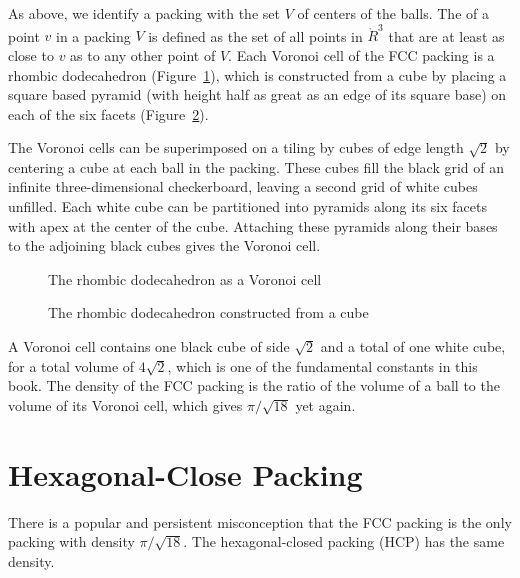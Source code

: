As above, we identify a packing with the set $V$ of centers of the balls.
The  of a point $v$ in a packing $V$ is defined as the set of all
points in $\ring{R}^3$ 
that are at least as close to $v$ as to any other point
of $V$.  Each Voronoi cell of the FCC packing is a
rhombic dodecahedron (Figure~\ref{fig:rhombic}),  %
which is constructed from a cube by placing a
square based pyramid (with height half as great as an edge of its
square base) on each of the six facets
(Figure~\ref{fig:rhombic-cube}).  %

The Voronoi cells can be superimposed on a tiling by cubes of edge length $\sqrt2$ by
centering a cube at each ball in the packing. These
cubes fill the black grid of an infinite three-dimensional
checkerboard, leaving a second grid of white cubes unfilled.  Each
white cube can be partitioned into pyramids along its six facets with apex
at the center of the cube.  Attaching these pyramids along their bases
to the adjoining black cubes gives the Voronoi cell.

\begin{figure}[htb]
  \centering
  \caption{The rhombic dodecahedron as a Voronoi cell}
  \label{fig:rhombic}
\end{figure}

\begin{figure}[htb]
  \centering
  \caption{The rhombic dodecahedron constructed from a cube}
  \label{fig:rhombic-cube}
\end{figure}

A Voronoi cell contains one black cube of side $\sqrt2$ and a total
of one white cube, for a total volume of $4\sqrt2$, which is
one of the fundamental constants in this book.  The density of the
FCC packing is the ratio of the volume of a ball to the volume
of its Voronoi cell, which gives $\pi/\sqrt{18}$ yet again.





\section{Hexagonal-Close Packing}

There is a popular and persistent misconception that the FCC
 packing is the only packing with density $\pi/\sqrt{18}$.
The hexagonal-closed packing (HCP) has the same density.
%
%
%
%

